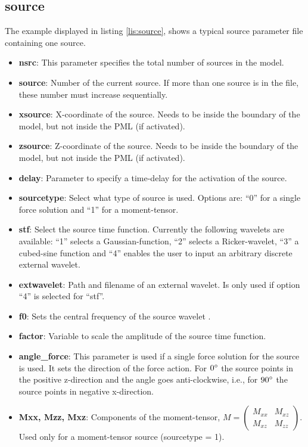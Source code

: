     \subsection{source}
    \label{subsec:source}
    	The example displayed in listing \ref{lis:source}, shows a typical source parameter file containing one source. 
     
    	\begin{itemize}
    		\item \textbf{nsrc}: This parameter specifies the total number of sources in the model.
    		\item \textbf{source}: Number of the current source. If more than one source is in the file, these number must increase sequentially.
    		\item \textbf{xsource}: X-coordinate of the source. Needs to be inside the boundary of the model, but not inside the PML (if activated).
    		\item \textbf{zsource}: Z-coordinate of the source. Needs to be inside the boundary of the model, but not inside the PML (if activated).
    		\item \textbf{delay}: Parameter to specify a time-delay for the activation of the source.
    		\item \textbf{sourcetype}: Select what type of source is used. Options are: ``0'' for a single force solution and ``1'' for a moment-tensor.
    		\item \textbf{stf}: Select the source time function. Currently the following wavelets are available: ``1'' selects a Gaussian-function, ``2'' selects a Ricker-wavelet, ``3'' a cubed-sine function and ``4'' enables the user to input an arbitrary discrete external wavelet.
    		\item \textbf{extwavelet}: Path and filename of an external wavelet. Is only used if option ``4'' is selected for ``stf''.
    		\item \textbf{f0}: Sets the central frequency of the source wavelet .
    		\item \textbf{factor}: Variable to scale the amplitude of the source time function.
    		\item \textbf{angle\_force}: This parameter is used if a single force solution for the source is used. It sets the direction of the force action. For $0\degree$ the source points in the positive z-direction and the angle goes anti-clockwise, i.e., for $90\degree$ the source points in negative x-direction.
    		\item \textbf{Mxx, Mzz, Mxz}: Components of the moment-tensor, $M=\left(\begin{smallmatrix} M_{xx} & M_{xz} \\ M_{xz} & M_{zz} \end{smallmatrix}\right)$. Used only for a moment-tensor source (sourcetype = 1).
    	\end{itemize}
    	

